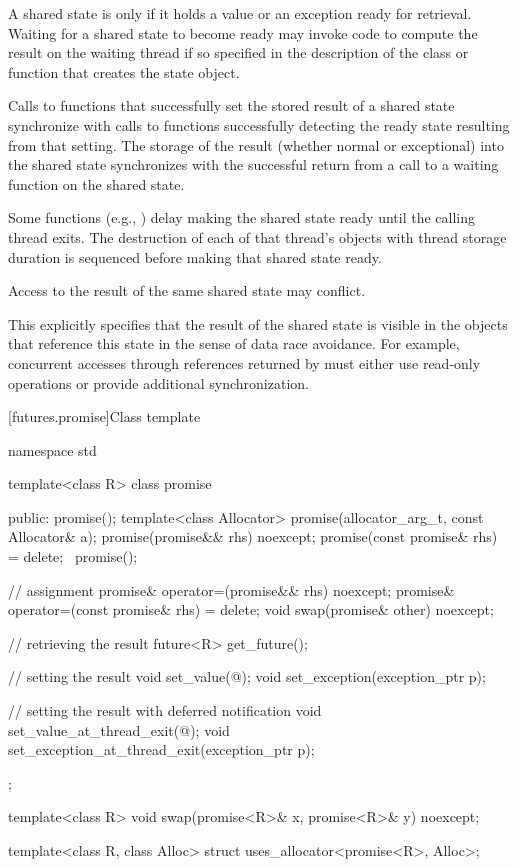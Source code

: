 \pnum
A shared state is  only if it holds a value or an exception ready for
retrieval.
Waiting for a shared state to become ready may invoke code to compute the result on
the waiting thread if so specified in the description of the class or function that creates
the state object.

\pnum
Calls to functions that successfully set the stored result of a shared
state synchronize
with calls to functions
successfully detecting the ready state resulting from that setting.
The storage of the result
(whether normal or exceptional) into the shared state
synchronizes with
the successful return from a call to a waiting function on the shared state.

\pnum
Some functions (e.g., ) delay making
the shared state ready until the calling thread exits. The destruction of
each of that thread's objects with thread storage duration
is sequenced before making that shared state ready.

\pnum
Access to the result of the same shared state may conflict.
\begin{note} This explicitly specifies that the result of the shared state is
visible in the objects that reference this state in the sense of data race
avoidance. For example, concurrent accesses through
references returned by 
must either use read-only operations or provide additional synchronization.
\end{note}

[futures.promise]{Class template }

%
\begin{codeblock}
namespace std {
  template<class R>
  class promise {
  public:
    promise();
    template<class Allocator>
      promise(allocator_arg_t, const Allocator& a);
    promise(promise&& rhs) noexcept;
    promise(const promise& rhs) = delete;
    ~promise();

    // assignment
    promise& operator=(promise&& rhs) noexcept;
    promise& operator=(const promise& rhs) = delete;
    void swap(promise& other) noexcept;

    // retrieving the result
    future<R> get_future();

    // setting the result
    void set_value(@\seebelow@);
    void set_exception(exception_ptr p);

    // setting the result with deferred notification
    void set_value_at_thread_exit(@\seebelow@);
    void set_exception_at_thread_exit(exception_ptr p);
  };

  template<class R>
    void swap(promise<R>& x, promise<R>& y) noexcept;

  template<class R, class Alloc>
    struct uses_allocator<promise<R>, Alloc>;
}
\end{codeblock}

